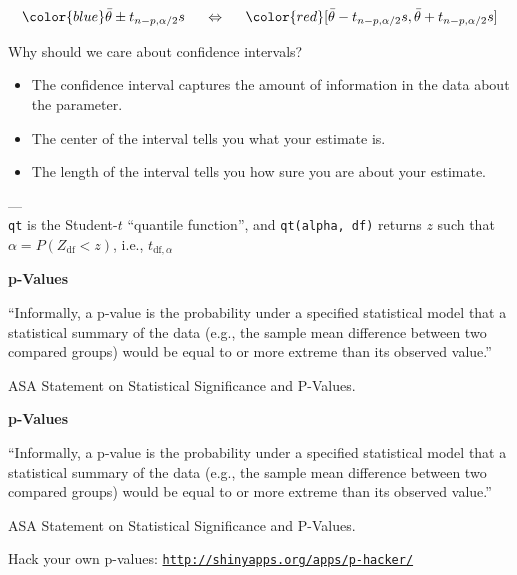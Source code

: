 \documentclass[12pt,xcolor=svgnames]{beamer}
\newcommand{\rd}{\color{red}}
\newcommand{\bl}{\color{blue}}
\newcommand{\theme}{\color{FireBrick}}
\newcommand{\sk}{\vspace{.4cm}}
\newcommand{\nochap}{\vspace{0.5cm}}
\newcommand{\nsk}{\vspace{-.4cm}}
\newcommand{\chap}[1]{{\theme \Large \bf #1} \sk}
\begin{document}
\begin{frame}
\nochap

\nsk\nsk\nsk
\[
 {\bl \bar{\theta} \pm t_{n-p,\alpha/2} s} \;\;\;\;\; \Leftrightarrow \;\;\;\;\; 
{\rd [\bar{\theta}- t_{n-p,\alpha/2} s, \bar{\theta} + t_{n-p,\alpha/2} s] }
\]

\sk
Why should we care about confidence intervals?

\begin{itemize}
\item The confidence interval captures the amount of information 
in the data about the parameter.
\item The center of the interval tells you what your estimate is.
\item The length of the interval tells you how sure you 
are about your estimate.
\end{itemize}

\sk
---\\
{\small  {\tt\rd qt} is the Student-$t$ ``quantile function'', and
 {\tt\rd  qt(alpha, df)} returns $z$ such that 
 {\rd$\alpha = P(Z_{\mathrm{df}} < z)$}}, i.e., {\rd $t_{\mathrm{df},\alpha}$}
\end{frame}


\begin{frame}
\chap{p-Values}

{\bl ``Informally, a p-value is the probability under a specified statistical
model that a statistical summary of the data (e.g., the sample
mean difference between two compared groups) would be equal
to or more extreme than its observed value.''} 
\begin{flushright} 
{\footnotesize ASA Statement on Statistical Significance and P-Values.}
\end{flushright}

\end{frame}


\begin{frame}
\chap{p-Values}

{\bl ``Informally, a p-value is the probability under a specified statistical
model that a statistical summary of the data (e.g., the sample
mean difference between two compared groups) would be equal
to or more extreme than its observed value.''} 
\begin{flushright} 
{\footnotesize ASA Statement on Statistical Significance and P-Values.}
\end{flushright}
\sk
\begin{center}
Hack your own p-values: {\bl \tt \url{http://shinyapps.org/apps/p-hacker/}}
\end{center}

\end{frame}
\fi
\end{document}
